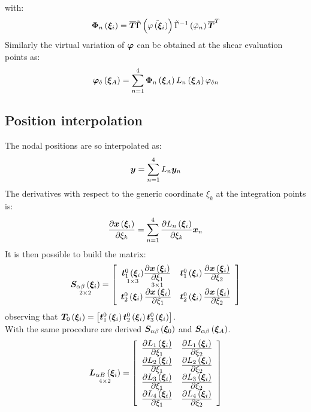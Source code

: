 with:
\begin{equation}
\T{ \Phi }_n \valxii =
\overline{ \T{ T } } \tilde{ \Gamma } \plbr{ \tilde{ \varphi \valxii } }  \tilde{ \Gamma } ^ {-1} \plbr{ \tilde{ \varphi }_n } \overline{ \T{ T } } ^ T
\end{equation}
Similarly the virtual variation of $\T{\varphi}$ can be obtained at the shear evaluation points as:
\begin{equation}
\T{ \varphi }_{\delta} \valxiA =
\sum_{ n = 1 }^{ 4 } \T{ \Phi }_n \valxiA L_n \valxiA \varphi_{\delta n}
\end{equation}
\subsection{Position interpolation}
The nodal positions are so interpolated as:
\begin{equation}
\T{ y }   = \sum_{ n = 1 }^4  L_n   \T{ y }_n
\end{equation}
The derivatives with respect to the generic coordinate $\xi_k$ at the integration points is:
\begin{equation}
\fracdp{ \T{ x } \valxii }{ \xi_k }  = \sum_{ n = 1 }^4 \fracdp{ L_n \valxii }{ \xi_k } \T{ x }_n
\end{equation}
It is then possible to build the matrix:
\begin{equation}
\underset{ 2 \times 2 }{ \T{ S }_{ \alpha \beta } \valxii } =
\sqbr{ \matr{ c  c  }{
\underset{ 1 \times 3 }{ \T{ t }_{1}^{0} \valxii } \underset{ 3 \times 1 }{ \fracdp{ \T{x} \valxii }{ \xi_1 } } & \T{ t }_{1}^{0} \valxii \fracdp{ \T{x} \valxii }{ \xi_2 } \\
\T{ t }_{2}^{0} \valxii \fracdp{ \T{x} \valxii }{ \xi_1 } & \T{ t }_{2}^{0} \valxii \fracdp{ \T{x} \valxii }{ \xi_2 }
}}
\end{equation}
observing that $\T{T}_0 \valxii = \sqbr{ \T{t}_{1}^{0} \valxii  \T{t}_{2}^{0} \valxii \T{t}_{3}^{0} \valxii }$.\\
With the same procedure are derived $\T{ S }_{ \alpha \beta } \valxio$ and  $\T{ S }_{ \alpha \beta } \valxiA$.\\
\begin{equation}
\underset{ 4 \times 2 } { \T{ L }_{ \alpha B } \valxii } =
\sqbr{ \matr{ c c }{
\fracdp{ L_1 \valxii }{ \xi_1 } & \fracdp{ L_1 \valxii }{ \xi_2 } \\
\fracdp{ L_2 \valxii }{ \xi_1 } & \fracdp{ L_2 \valxii }{ \xi_2 } \\
\fracdp{ L_3 \valxii }{ \xi_1 } & \fracdp{ L_3 \valxii }{ \xi_2 } \\
\fracdp{ L_4 \valxii }{ \xi_1 } & \fracdp{ L_4 \valxii }{ \xi_2 } \\
}}
\end{equation}
